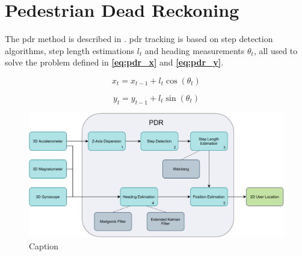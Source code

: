\section{Pedestrian Dead Reckoning}

The \gls{pdr} method is described in \cite{HybridPositioningPaper}. \gls{pdr} tracking is based on step detection algorithms, step length estimations $l_t$ and heading measurements $\theta_t$, all used to solve the problem defined in \textbf{\autoref{eq:pdr_x}} and \textbf{\autoref{eq:pdr_y}}.

\begin{equation} \label{eq:pdr_x}
    x_t = x_{t - 1} + l_t\cos(\theta_t)
\end{equation}

\begin{equation} \label{eq:pdr_y}
    y_t = y_{t - 1} + l_t\sin(\theta_t)
\end{equation}

\begin{figure}[H] \label{fig:pdr}
    \centering
    \includegraphics[scale=0.3]{Images/Experiments/pdr.pdf}
    \caption{Caption}
\end{figure}






